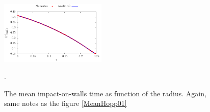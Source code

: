 \documentclass[superscriptaddress,pre,reprint,showpacs,onecolumn]{revtex4-1}
\begin{document}
\begin{figure}[h]
  \centering
  \includegraphics[width=0.45\textwidth]{./FigurasPerfectas/ImpactWall02.pdf}
  \caption{The mean impact-on-walls time as function of the radius. Again, same
    notes as the figure \ref{MeanHopp01}}\label{MeanImp01}.
\end{figure}

\end{document}
